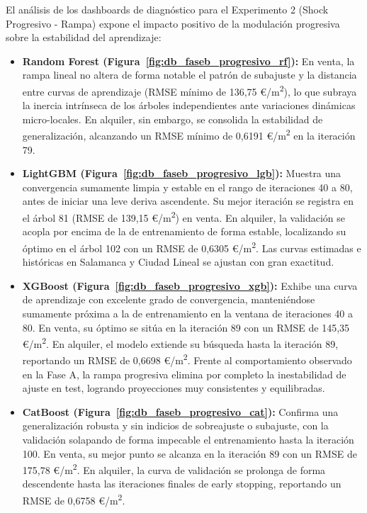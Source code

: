 \documentclass[a4paper,11pt,openany]{book}
\begin{document}
El análisis de los dashboards de diagnóstico para el Experimento 2 (Shock Progresivo - Rampa) expone el impacto positivo de la modulación progresiva sobre la estabilidad del aprendizaje:
\begin{itemize}
    \item \textbf{Random Forest (Figura~\ref{fig:db_faseb_progresivo_rf}):} En venta, la rampa lineal no altera de forma notable el patrón de subajuste y la distancia entre curvas de aprendizaje (RMSE mínimo de 136,75 €/m\textsuperscript{2}), lo que subraya la inercia intrínseca de los árboles independientes ante variaciones dinámicas micro-locales. En alquiler, sin embargo, se consolida la estabilidad de generalización, alcanzando un RMSE mínimo de 0,6191 €/m\textsuperscript{2} en la iteración 79.
    \item \textbf{LightGBM (Figura~\ref{fig:db_faseb_progresivo_lgb}):} Muestra una convergencia sumamente limpia y estable en el rango de iteraciones 40 a 80, antes de iniciar una leve deriva ascendente. Su mejor iteración se registra en el árbol 81 (RMSE de 139,15 €/m\textsuperscript{2}) en venta. En alquiler, la validación se acopla por encima de la de entrenamiento de forma estable, localizando su óptimo en el árbol 102 con un RMSE de 0,6305 €/m\textsuperscript{2}. Las curvas estimadas e históricas en Salamanca y Ciudad Lineal se ajustan con gran exactitud.
    \item \textbf{XGBoost (Figura~\ref{fig:db_faseb_progresivo_xgb}):} Exhibe una curva de aprendizaje con excelente grado de convergencia, manteniéndose sumamente próxima a la de entrenamiento en la ventana de iteraciones 40 a 80. En venta, su óptimo se sitúa en la iteración 89 con un RMSE de 145,35 €/m\textsuperscript{2}. En alquiler, el modelo extiende su búsqueda hasta la iteración 89, reportando un RMSE de 0,6698 €/m\textsuperscript{2}. Frente al comportamiento observado en la Fase A, la rampa progresiva elimina por completo la inestabilidad de ajuste en test, logrando proyecciones muy consistentes y equilibradas.
    \item \textbf{CatBoost (Figura~\ref{fig:db_faseb_progresivo_cat}):} Confirma una generalización robusta y sin indicios de sobreajuste o subajuste, con la validación solapando de forma impecable el entrenamiento hasta la iteración 100. En venta, su mejor punto se alcanza en la iteración 89 con un RMSE de 175,78 €/m\textsuperscript{2}. En alquiler, la curva de validación se prolonga de forma descendente hasta las iteraciones finales de early stopping, reportando un RMSE de 0,6758 €/m\textsuperscript{2}.
\end{itemize}
\end{document}
